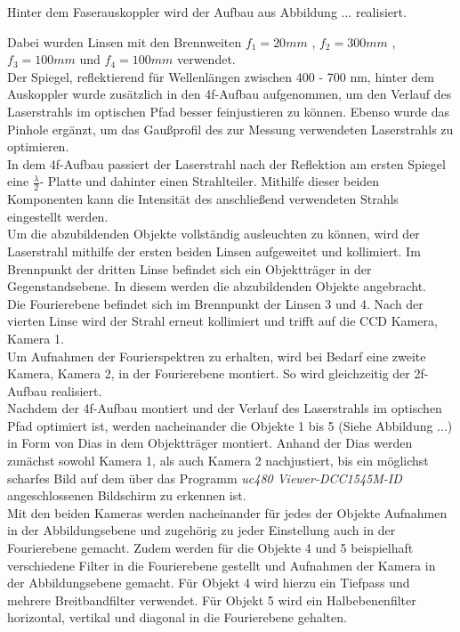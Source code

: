 

Hinter dem Faserauskoppler wird der Aufbau aus Abbildung ... realisiert.
 \begin{comment} Abbildung und Nummerierung noch ergänzen!!! \end{comment} 
Dabei wurden Linsen mit den Brennweiten $f_{1}=20mm$ , $f_{2}=300mm$ , $f_{3}=100mm$ und $f_{4}=100mm$ verwendet. \\
Der Spiegel, reflektierend für Wellenlängen zwischen 400 - 700 nm, hinter dem Auskoppler wurde zusätzlich in den 4f-Aufbau aufgenommen, um den Verlauf des Laserstrahls im optischen Pfad besser feinjustieren zu können. Ebenso wurde das Pinhole ergänzt, um das Gaußprofil des zur Messung verwendeten Laserstrahls zu optimieren. \\

In dem 4f-Aufbau passiert der Laserstrahl nach der Reflektion am ersten Spiegel eine $\frac{\lambda}{2}$- Platte und dahinter einen Strahlteiler. Mithilfe dieser beiden Komponenten kann die Intensität des anschließend verwendeten Strahls eingestellt werden. \\
Um die abzubildenden Objekte vollständig ausleuchten zu können, wird der Laserstrahl mithilfe der ersten beiden Linsen aufgeweitet und kollimiert. Im Brennpunkt der dritten Linse befindet sich ein Objektträger in der Gegenstandsebene. In diesem werden die abzubildenden Objekte angebracht. \\
Die Fourierebene befindet sich im Brennpunkt der Linsen 3 und 4. Nach der vierten Linse wird der Strahl erneut kollimiert und trifft auf die CCD Kamera, Kamera 1. \\
Um Aufnahmen der Fourierspektren zu erhalten, wird bei Bedarf eine zweite Kamera, Kamera 2, in der Fourierebene montiert. So wird gleichzeitig der 2f-Aufbau realisiert. \\ 

Nachdem der 4f-Aufbau montiert und der Verlauf des Laserstrahls im optischen Pfad optimiert ist, werden nacheinander die Objekte 1 bis 5 (Siehe Abbildung ...) in Form von Dias in dem Objektträger montiert. Anhand der Dias werden zunächst sowohl Kamera 1, als auch Kamera 2 nachjustiert, bis ein möglichst scharfes Bild auf dem über das Programm \textit{uc480 Viewer-DCC1545M-ID} angeschlossenen Bildschirm zu erkennen ist.  \\
Mit den beiden Kameras werden nacheinander für jedes der Objekte Aufnahmen in der Abbildungsebene und zugehörig zu jeder Einstellung auch in der Fourierebene gemacht. Zudem werden für die Objekte 4 und 5 beispielhaft verschiedene Filter in die Fourierebene gestellt und Aufnahmen der Kamera in der Abbildungsebene gemacht. Für Objekt 4 wird hierzu ein Tiefpass und mehrere Breitbandfilter verwendet. Für Objekt 5 wird ein Halbebenenfilter horizontal, vertikal und diagonal in die Fourierebene gehalten. \\

